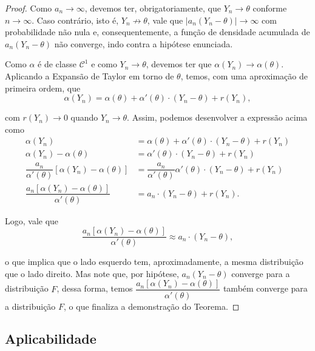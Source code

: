\documentclass{article}
\begin{document}
\begin{proof}
    Como $a_n \to \infty$, devemos ter, obrigatoriamente, que $Y_n \to \theta$ conforme $n\to \infty$. Caso contrário, isto é, $Y_n \not \to \theta$, vale que $|a_n(Y_n - \theta)| \to \infty$ com probabilidade não nula e, consequentemente, a função de densidade acumulada de $a_n(Y_n - \theta)$ não converge, indo contra a hipótese enunciada.
    
    \noindent Como $\alpha$ é de classe $\mathcal{C}^1$ e como $Y_n \to \theta$, devemos ter que $\alpha(Y_n) \to \alpha(\theta)$. Aplicando a Expansão de Taylor em torno de $\theta$, temos, com uma aproximação de primeira ordem, que
    \[\alpha(Y_n) = \alpha(\theta) + \alpha'(\theta)\cdot (Y_n - \theta) + r(Y_n),\]
    
    \noindent com $r(Y_n) \to 0$ quando $Y_n \to \theta$. Assim, podemos desenvolver a expressão acima como
    \begin{equation*}
        \begin{split}
            \alpha(Y_n) & = \alpha(\theta) + \alpha'(\theta)\cdot (Y_n - \theta) + r(Y_n) \\
            \alpha(Y_n) - \alpha(\theta) & = \alpha'(\theta)\cdot (Y_n - \theta) + r(Y_n) \\
            \dfrac{a_n}{\alpha'(\theta)}\left[\alpha(Y_n) - \alpha(\theta)\right] & = \dfrac{a_n}{\alpha'(\theta)}\alpha'(\theta)\cdot (Y_n - \theta) + r(Y_n) \\
            \dfrac{a_n[\alpha(Y_n) - \alpha(\theta)]}{\alpha'(\theta)} & = a_n\cdot (Y_n - \theta) + r(Y_n).
        \end{split}
    \end{equation*}
    
    \noindent Logo, vale que
    \[\dfrac{a_n[\alpha(Y_n) - \alpha(\theta)]}{\alpha'(\theta)} \approx a_n\cdot (Y_n - \theta),\]
    
    \noindent o que implica que o lado esquerdo tem, aproximadamente, a mesma distribuição que o lado direito. Mas note que, por hipótese, $a_n(Y_n - \theta)$ converge para a distribuição $F$, dessa forma, temos $\dfrac{a_n[\alpha(Y_n) - \alpha(\theta)]}{\alpha'(\theta)}$ também converge para a distribuição $F$, o que finaliza a demonstração do Teorema.
\end{proof}

\subsection*{Aplicabilidade}
\end{document}
